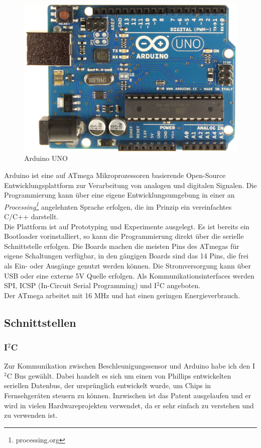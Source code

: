\documentclass[12pt,a4paper]{scrartcl}
\begin{document}
\begin{figure}[h]
\centering
\includegraphics[scale=.2]{hardwareimages/ArduinoUno_R3_Front.jpg}
\caption{Arduino UNO}
\label{Arduino}
\end{figure}


Arduino ist eine auf ATmega Mikroprozessoren basierende Open-Source Entwicklungsplattform zur Verarbeitung von analogen und digitalen Signalen. Die Programmierung kann über eine eigene Entwicklungsumgebung in einer an \textit{Processing\footnote{processing.org}} angelehnten Sprache erfolgen, die im Prinzip ein vereinfachtes C/C++ darstellt.\\
Die Plattform ist auf Prototyping und Experimente ausgelegt. Es ist bereits ein Bootloader vorinstalliert, so kann die Programmierung direkt über die serielle Schnittstelle erfolgen. Die Boards machen die meisten Pins des ATmegas für eigene Schaltungen verfügbar, in den gängigen Boards sind das 14 Pins, die frei als Ein- oder Ausgänge genutzt werden können.
Die Stromversorgung kann über USB oder eine externe 5V Quelle erfolgen. Als Kommunikationsinterfaces werden SPI, ICSP (In-Circuit Serial Programming) und I$^2$C angeboten.\\
Der ATmega arbeitet mit 16 MHz und hat einen geringen Energieverbrauch.


\subsection{Schnittstellen}

\subsubsection{I$^2$C}
Zur Kommunikation zwischen Beschleunigungssensor und Arduino habe ich den  I$^2$C Bus \citep{:2012fj} gewählt.
Dabei handelt es sich um einen von Phillips entwickelten seriellen Datenbus, der ursprünglich entwickelt wurde, um Chips in Fernsehgeräten steuern zu können. Inzwischen ist das Patent ausgelaufen und er wird in vielen Hardwareprojekten verwendet, da er sehr einfach zu verstehen und zu verwenden ist. 
\end{document}
